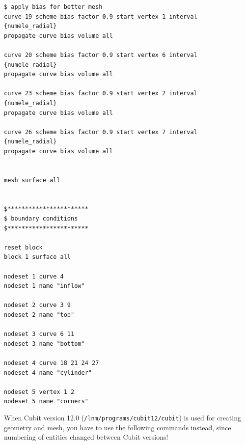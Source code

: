 \begin{small}
\begin{verbatim}
$ apply bias for better mesh
curve 19 scheme bias factor 0.9 start vertex 1 interval {numele_radial}
propagate curve bias volume all

curve 20 scheme bias factor 0.9 start vertex 6 interval {numele_radial}
propagate curve bias volume all

curve 23 scheme bias factor 0.9 start vertex 2 interval {numele_radial}
propagate curve bias volume all

curve 26 scheme bias factor 0.9 start vertex 7 interval {numele_radial}
propagate curve bias volume all


mesh surface all


$***********************
$ boundary conditions 
$***********************

reset block
block 1 surface all

nodeset 1 curve 4
nodeset 1 name "inflow"

nodeset 2 curve 3 9
nodeset 2 name "top"

nodeset 3 curve 6 11
nodeset 3 name "bottom"

nodeset 4 curve 18 21 24 27
nodeset 4 name "cylinder"

nodeset 5 vertex 1 2
nodeset 5 name "corners"
\end{verbatim} \end{small}

When Cubit version 12.0 (\texttt{/lnm/programs/cubit12/cubit}) is used for 
creating geometry and mesh, you have to use the following commands instead,
since numbering of entities changed between Cubit versions!

